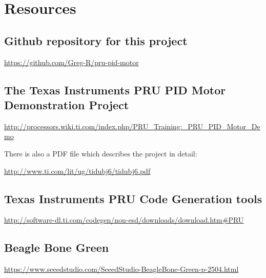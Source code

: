 %
%
%

\chapter{Resources}

\section{Github repository for this project}

\url{https://github.com/Greg-R/pru-pid-motor}

\section{The Texas Instruments PRU PID Motor Demonstration Project}


\url{http://processors.wiki.ti.com/index.php/PRU_Training:_PRU_PID_Motor_Demo}

There is also a PDF file which describes the project in detail:

\url{http://www.ti.com/lit/ug/tidubj6/tidubj6.pdf}

\section{Texas Instruments PRU Code Generation tools}

\url{http://software-dl.ti.com/codegen/non-esd/downloads/download.htm#PRU}

\section{Beagle Bone Green}

\url{https://www.seeedstudio.com/SeeedStudio-BeagleBone-Green-p-2504.html}

